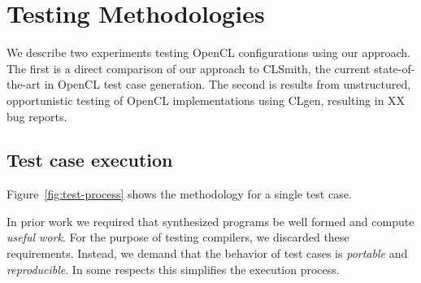 \section{Testing Methodologies}\label{sec:methodology}

We describe two experiments testing OpenCL configurations using our approach. The first is a direct comparison of our approach to CLSmith, the current state-of-the-art in OpenCL test case generation. The second is results from unstructured, opportunistic testing of OpenCL implementations using CLgen, resulting in XX bug reports.



% 

%
%

\subsection{Test case execution}

Figure~\ref{fig:test-process} shows the methodology for a single test case.

In prior work we required that synthesized programs be well formed and compute \emph{useful work}. For the purpose of testing compilers, we discarded these requirements. Instead, we demand that the behavior of test cases is \emph{portable} and \emph{reproducible}. In some respects this simplifies the execution process.

